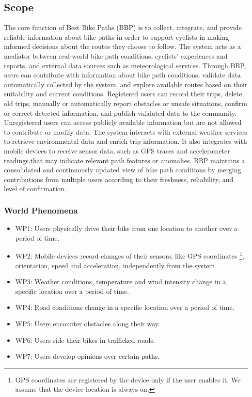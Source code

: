 \subsection{Scope} %
The core function of Best Bike Paths (BBP) is to collect, integrate, and provide reliable information about bike paths in order to support cyclists in making informed decisions about the routes they choose to follow. The system acts as a mediator between real-world bike path conditions, cyclists’ experiences and reports, and external data sources such as meteorological services.
Through BBP, users can contribute with information about bike path conditions, validate data automatically collected by the system, and explore available routes based on their suitability and current conditions. Registered users can record their trips, delete old trips,  manually or automatically report obstacles or unsafe situations, confirm or correct detected information, and publish validated data to the community. Unregistered users can access publicly available information but are not allowed to contribute or modify data.
The system interacts with external weather services to retrieve environmental data and enrich trip information. It also integrates with mobile devices to receive sensor data, such as GPS traces and accelerometer readings,that may indicate relevant path features or anomalies. BBP maintains a consolidated and continuously updated view of bike path conditions by merging contributions from multiple users according to their freshness, reliability, and level of confirmation.

\subsubsection{World Phenomena}
\begin{itemize}
    \item WP1: Users physically drive their bike from one location to another over a period of time.
    \item WP2: Mobile devices record changes of their sensors, like GPS coordinates \footnote{GPS coordinates are registered by the device only if the user enables it. We assume that the device location is always on.}, orientation, speed and acceleration, independently from the system. 
    \item WP3: Weather conditions, temperature and wind intensity change in a specific location over a period of time.
    \item WP4: Road conditions change in a specific location over a period of time.
    \item WP5: Users encounter obstacles along their way.
    \item WP6: Users ride their bikes in trafficked roads.
    \item WP7: Users develop opinions over certain paths.

\end{itemize}

